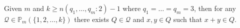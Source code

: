 Given $m$ and $k \geq n(q_1, \ldots, q_m: 2) - 1$ where $q_1 = \ldots = q_m = 3$, then for any $\mathcal{Q} \in \mathbb{P}_m(\{1, 2, \ldots, k\})$ there exists $Q \in \mathcal{Q}$ and $x, y \in Q$ such that $x + y \in Q$.
